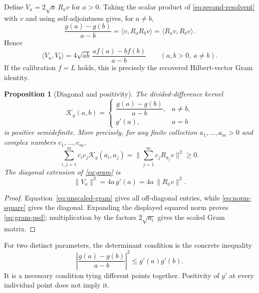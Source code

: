 \documentclass[11pt,a4paper]{article}
\numberwithin{equation}{section}
\newtheorem{proposition}[theorem]{Proposition}
\theoremstyle{definition}
\theoremstyle{remark}
\newcommand{\ip}[2]{\langle #1,#2\rangle}
\newcommand{\norm}[1]{\lVert #1\rVert}
\begin{document}
Define $V_a=2\sqrt a\,R_av$ for $a>0$.
Taking the scalar product of \eqref{eq:second-resolvent} with $v$
and using self-adjointness gives, for $a\ne b$,
\begin{equation}\label{eq:unscaled-gram}
\frac{g(a)-g(b)}{a-b}
=\ip v{R_aR_bv}=\ip{R_av}{R_bv}.
\end{equation}
Hence
\begin{equation}\label{eq:gram}
\ip{V_a}{V_b}
=4\sqrt{ab}\,\frac{af(a)-bf(b)}{a-b}\qquad(a,b>0,\ a\ne b).
\end{equation}
If the calibration $f=L$ holds, this is precisely the recovered
Hilbert-vector Gram identity.

\begin{proposition}[Diagonal and positivity]\label{prop:gram}
The divided-difference kernel
\begin{equation}\label{eq:kernel}
\mathcal K_g(a,b)=
\begin{cases}
\dfrac{g(a)-g(b)}{a-b},&a\ne b,\\[5pt]
g'(a),&a=b
\end{cases}
\end{equation}
is positive semidefinite. More precisely, for any finite collection
$a_1,\ldots,a_m>0$ and complex numbers $c_1,\ldots,c_m$,
\begin{equation}\label{eq:gram-psd}
\sum_{i,j=1}^m\overline{c_i}c_j\mathcal K_g(a_i,a_j)
=\norm{\sum_{j=1}^m c_jR_{a_j}v}^2\geq0.
\end{equation}
The diagonal extension of \eqref{eq:gram} is
\begin{equation}\label{eq:gram-diagonal}
\norm{V_a}^2=4a\,g'(a)=4a\,\norm{R_av}^2.
\end{equation}
\end{proposition}
\begin{proof}
Equation~\eqref{eq:unscaled-gram} gives all off-diagonal entries, while
\eqref{eq:norm-square} gives the diagonal. Expanding the displayed squared
norm proves \eqref{eq:gram-psd}; multiplication by the factors
$2\sqrt{a_i}$ gives the scaled Gram matrix.
\end{proof}

For two distinct parameters, the determinant condition is the concrete inequality
\begin{equation}\label{eq:two-point}
\left|\frac{g(a)-g(b)}{a-b}\right|^2\leq g'(a)g'(b).
\end{equation}
It is a necessary condition tying different points together. Positivity of
$g'$ at every individual point does not imply it.
\end{document}
